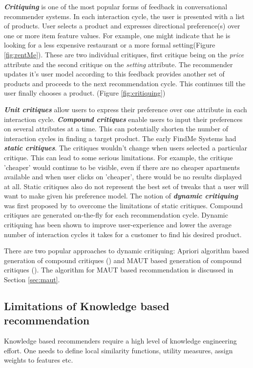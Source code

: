 \textit{\textbf{Critiquing}} is one of the most popular forms of feedback in conversational recommender systems. In each interaction cycle, the user is presented with a list of products.
User selects a product and expresses directional preference(s) over one or more item feature values. 
For example, one might indicate that he is looking for a less expensive restaurant or a more formal setting(Figure \ref{fig:rentMe}). These are two individual critiques, first critique being on the \textit{price} attribute and the second critique on the \textit{setting} attribute. 
The recommender updates it's user model according to this feedback provides another set of products and proceeds to the next recommendation cycle. This continues till the user finally chooses a product. (Figure \ref{fig:critiquing})

\textit{\textbf{Unit critiques}} allow users to express their preference over one attribute in each interaction cycle. \textit{\textbf{Compound critiques}} enable users to input their preferences on several attributes at a time. This can potentially shorten the number of interaction cycles in finding a target product.
The early FindMe Systems \cite{burkeEarlierSystems} had \textit{\textbf{static critiques}}. The critiques wouldn't change when users selected a particular critique. 
This can lead to some serious limitations.
For example, the critique 'cheaper' would continue to be visible, even if there are no cheaper apartments available and when user clicks on 'cheaper', there would be no results displayed at all.
Static critiques also do not represent the best set of tweaks that a user will want to make given his preference model.
The notion of \textit{\textbf{dynamic critiquing}} was first proposed by \cite{mccarthy2004dynamic} to overcome the limitations of static critiques.
Compound critiques are generated on-the-fly for each recommendation cycle. Dynamic critiquing has been shown to improve user-experience and lower the average number of interaction cycles it takes for a customer to find his desired product.

There are two popular approaches to dynamic critiquing: Apriori algorithm based generation of compound critiques (\cite{mccarthy2004dynamic}) and MAUT based generation of compound critiques (\cite{mautPaper}). 
The algorithm for MAUT based recommendation is discussed in Section \ref{sec:maut}.

\subsection{Limitations of Knowledge based recommendation}
Knowledge based recommenders require a high level of knowledge engineering effort.
One needs to define local similarity functions, utility measures, assign weights to features etc.

